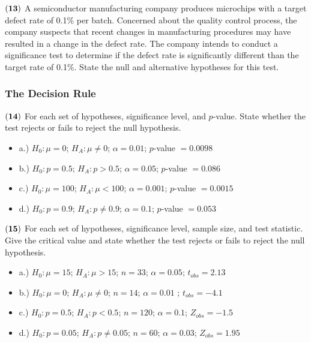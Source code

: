 \documentclass[
]{article}
\begin{document}
\(\bf (13)\) A semiconductor manufacturing company produces microchips
with a target defect rate of 0.1\% per batch. Concerned about the
quality control process, the company suspects that recent changes in
manufacturing procedures may have resulted in a change in the defect
rate. The company intends to conduct a significance test to determine if
the defect rate is significantly different than the target rate of
0.1\%. State the null and alternative hypotheses for this test.

\subsubsection{The Decision Rule}\label{the-decision-rule}

\(\bf (14)\) For each set of hypotheses, significance level, and
\(p\)-value. State whether the test rejects or fails to reject the null
hypothesis.

\begin{itemize}
\item
  a.) \(H_0: \mu = 0\); \(H_A: \mu \neq 0\); \(\alpha = 0.01\);
  \(p\)-value \(= 0.0098\)
\item
  b.) \(H_0: p = 0.5\); \(H_A: p > 0.5\); \(\alpha = 0.05\); \(p\)-value
  \(= 0.086\)
\item
  c.) \(H_0: \mu = 100\); \(H_A: \mu < 100\); \(\alpha = 0.001\);
  \(p\)-value \(= 0.0015\)
\item
  d.) \(H_0: p = 0.9\); \(H_A: p \neq 0.9\); \(\alpha = 0.1\);
  \(p\)-value \(= 0.053\)
\end{itemize}

\(\bf (15)\) For each set of hypotheses, significance level, sample
size, and test statistic. Give the critical value and state whether the
test rejects or fails to reject the null hypothesis.

\begin{itemize}
\item
  a.) \(H_0: \mu = 15\); \(H_A: \mu > 15\); \(n = 33\);
  \(\alpha = 0.05\); \(t_{obs} = 2.13\)
\item
  b.) \(H_0: \mu = 0\); \(H_A: \mu \neq 0\); \(n = 14\);
  \(\alpha = 0.01\) ; \(t_{obs} = -4.1\)
\item
  c.) \(H_0: p = 0.5\); \(H_A: p < 0.5\); \(n = 120\); \(\alpha = 0.1\);
  \(Z_{obs} = -1.5\)
\item
  d.) \(H_0: p = 0.05\); \(H_A: p \neq 0.05\); \(n = 60\);
  \(\alpha = 0.03\); \(Z_{obs} = 1.95\)
\end{itemize}
\end{document}
